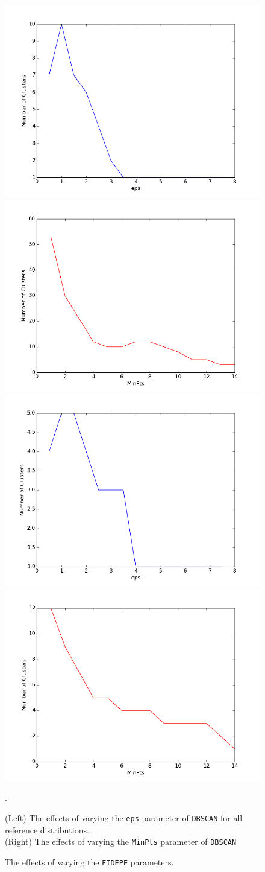 \documentclass[12pt]{article}
\begin{document}
\begin{figure}[ht]
\includegraphics[width=0.35\linewidth]{plots/jain_eps}
\includegraphics[width=0.35\linewidth]{plots/jain_minpts} \\
\includegraphics[width=0.35\linewidth]{plots/spiral_eps}
\includegraphics[width=0.35\linewidth]{plots/spiral_minpts}
\caption{(Left) The effects of varying the \texttt{eps} parameter of \texttt{DBSCAN} for all reference distributions. \\ 
(Right) The effects of varying the \texttt{MinPts} parameter of \texttt{DBSCAN}}.
\label{fig:DBSCANplots}
\end{figure}


\begin{figure}[ht]
\centering

\caption{The effects of varying the \texttt{FIDEPE} parameters.}
\label{fig:FIDPEPEplots}
\end{figure}

\clearpage


\end{document}
